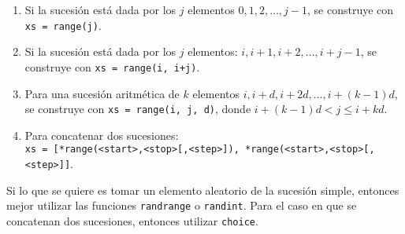 \documentclass[12pt]{article}
\theoremstyle{definition}
\begin{document}
\begin{enumerate}
  \item Si la sucesión está dada por los $j$ elementos $0, 1, 2, \dots, j - 1$, se construye con \verb|xs = range(j)|.
  \item Si la sucesión está dada por los $j$ elementos: $i, i+1, i+2, \dots, i + j - 1$, se construye con \verb|xs = range(i, i+j)|.
  \item Para una sucesión aritmética de $k$ elementos $i, i + d, i + 2d, \dots, i + (k-1)d$, se construye con \verb|xs = range(i, j, d)|, donde $i + (k-1)d < j \leq i + kd$.
  \item Para concatenar dos sucesiones:\\[1ex]
    \verb|xs = [*range(<start>,<stop>[,<step>]), *range(<start>,<stop>[,<step>]]|.
\end{enumerate}

Si lo que se quiere es tomar un elemento aleatorio de la sucesión simple, entonces mejor utilizar las funciones \verb|randrange| o \verb|randint|. Para el caso en que se concatenan dos sucesiones, entonces utilizar \verb|choice|.
\end{document}
